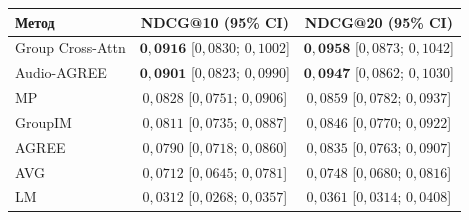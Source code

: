 \small
\begin{tabular}{lcc}
    \toprule
    Метод & NDCG@10 (95\% CI) & NDCG@20 (95\% CI) \\
    \midrule
    Group Cross-Attn & $\mathbf{0{,}0916}$ [$0{,}0830$; $0{,}1002$] & $\mathbf{0{,}0958}$ [$0{,}0873$; $0{,}1042$] \\
    Audio-AGREE      & $\mathbf{0{,}0901}$ [$0{,}0823$; $0{,}0990$] & $\mathbf{0{,}0947}$ [$0{,}0862$; $0{,}1030$] \\
    MP               & $0{,}0828$ [$0{,}0751$; $0{,}0906$] & $0{,}0859$ [$0{,}0782$; $0{,}0937$] \\
    GroupIM          & $0{,}0811$ [$0{,}0735$; $0{,}0887$] & $0{,}0846$ [$0{,}0770$; $0{,}0922$] \\
    AGREE            & $0{,}0790$ [$0{,}0718$; $0{,}0860$] & $0{,}0835$ [$0{,}0763$; $0{,}0907$] \\
    AVG              & $0{,}0712$ [$0{,}0645$; $0{,}0781$] & $0{,}0748$ [$0{,}0680$; $0{,}0816$] \\
    LM               & $0{,}0312$ [$0{,}0268$; $0{,}0357$] & $0{,}0361$ [$0{,}0314$; $0{,}0408$] \\
    \bottomrule
\end{tabular}